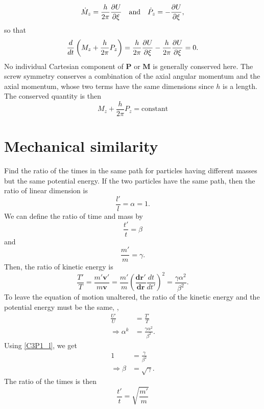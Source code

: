 \begin{subproblem}
{\begin{equation*}
    \Dot{M}_z = \frac{h}{2\pi} \frac{\partial U}{\partial \xi} \quad \text{and} \quad \Dot{P}_z = -\frac{\partial U}{\partial \xi},
\end{equation*}
so that
\begin{equation*}
    \frac{d}{dt} \left( M_z + \frac{h}{2\pi} P_z \right) = \frac{h}{2\pi} \frac{\partial U}{\partial \xi} - \frac{h}{2\pi} \frac{\partial U}{\partial \xi} = 0 .
\end{equation*}
No individual Cartesian component of $\mathbf{P}$ or $\mathbf{M}$ is generally conserved here. The screw symmetry conserves a combination of the axial angular momentum and the axial momentum, whose two terms have the same dimensions since $h$ is a length. The conserved quantity is then
}
{
\begin{equation*}
    M_z + \frac{h}{2\pi} P_z = \text{constant}
\end{equation*}
}
\end{subproblem}

\section{Mechanical similarity}


\begin{problem}
{
Find the ratio of the times in the same path for particles having different masses but the same potential energy.
}
{
If the two particles have the same path, then the ratio of linear dimension is
\begin{equation} \label{C3P1_l}
    \frac{l'}{l} = \alpha = 1.
\end{equation}
We can define the ratio of time and mass by
\begin{equation*}
    \frac{t'}{t} = \beta
\end{equation*}
and
\begin{equation*}
    \frac{m'}{m} = \gamma .
\end{equation*}
Then, the ratio of kinetic energy is 
\begin{equation*}
    \frac{T'}{T} = \frac{m' \mathbf{v}'}{m \mathbf{v}} = \frac{m'}{m} \left( \frac{\mathbf{dr}'}{\mathbf{dr}} \frac{dt}{dt'} \right)^2 = \frac{\gamma \alpha^2}{\beta^2}.
\end{equation*}
To leave the equation of motion unaltered, the ratio of the kinetic energy and the potential energy must be the same, \ie,
\begin{align*}
    \frac{U'}{U} &= \frac{T'}{T} \\
    \Rightarrow \alpha^k &=  \frac{\gamma \alpha^2}{\beta^2}.
\end{align*}
Using \eqref{C3P1_l}, we get
\begin{align*}
    1 &= \frac{\gamma}{\beta^2} \\
    \Rightarrow \beta &= \sqrt{\gamma}.
\end{align*}
The ratio of the times is then
}
{
\begin{equation*}
    \frac{t'}{t} = \sqrt{\frac{m'}{m}}
\end{equation*}
}
\end{problem}

